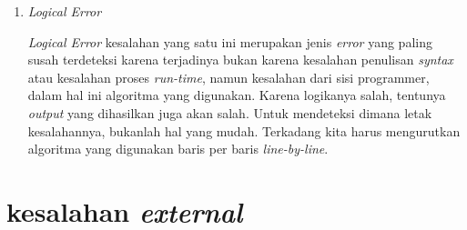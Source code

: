 \begin{enumerate}
\item \textit{Logical Error}
\par
\textit{Logical Error} kesalahan yang satu ini merupakan jenis \textit{error} yang paling susah terdeteksi karena terjadinya bukan karena kesalahan penulisan \textit{syntax} atau kesalahan proses \textit{run-time}, namun kesalahan dari sisi programmer, dalam hal ini algoritma yang digunakan. Karena logikanya salah, tentunya \textit{output} yang dihasilkan juga akan salah. Untuk mendeteksi dimana letak kesalahannya, bukanlah hal yang mudah. Terkadang kita harus mengurutkan algoritma yang digunakan baris per baris \textit{line-by-line}.
\end{enumerate}

\section{kesalahan \textit{external}}
